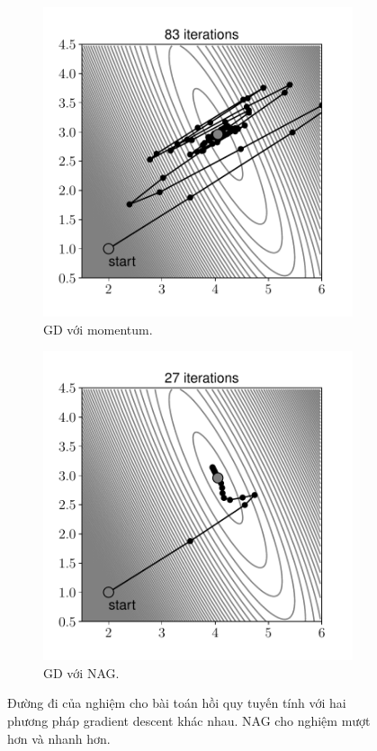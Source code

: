 \begin{figure}[t]
    \begin{subfigure}{0.49\textwidth}
    \includegraphics[width=0.99\linewidth]{ebookML_src/src/grad_descent/LR_gd_moment.pdf}
    \caption{GD với momentum.}
    \label{fig:8_momentnaga}
    \end{subfigure}
    \begin{subfigure}{0.49\textwidth}
    \includegraphics[width=0.99\linewidth]{ebookML_src/src/grad_descent/LR_gd_nag.pdf}
    \caption{GD với NAG.}
    \label{fig:8_momentnagb}
    \end{subfigure}
    \caption{
     Đường đi của nghiệm cho bài toán hồi quy tuyến tính với hai phương pháp
     gradient descent khác nhau. NAG cho nghiệm mượt hơn và nhanh hơn.
    }
    \label{fig:8_momentnag}
\end{figure}

